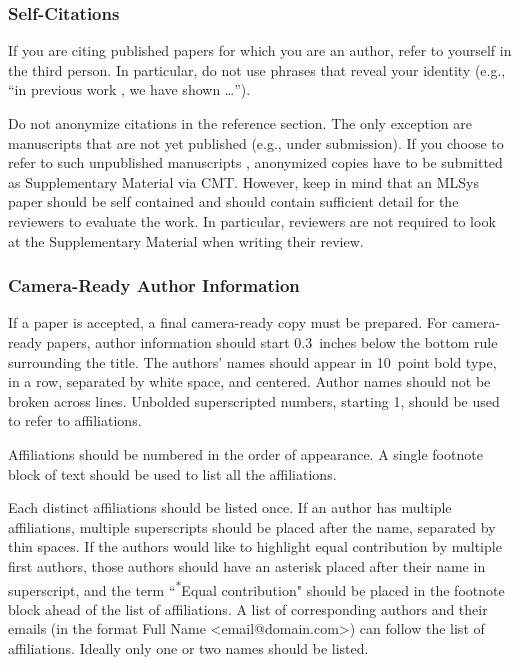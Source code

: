 \documentclass{article}
\begin{document}
\subsubsection{Self-Citations}

If you are citing published papers for which you are an author, refer
to yourself in the third person. In particular, do not use phrases
that reveal your identity (e.g., ``in previous work \cite{langley00}, we
have shown \ldots'').

Do not anonymize citations in the reference section. The only exception are manuscripts that are
not yet published (e.g., under submission). If you choose to refer to
such unpublished manuscripts \cite{anonymous}, anonymized copies have
to be submitted
as Supplementary Material via CMT\@. However, keep in mind that an MLSys
paper should be self contained and should contain sufficient detail
for the reviewers to evaluate the work. In particular, reviewers are
not required to look at the Supplementary Material when writing their
review.

\subsubsection{Camera-Ready Author Information}
\label{final author}

If a paper is accepted, a final camera-ready copy must be prepared.
%
For camera-ready papers, author information should start 0.3~inches below the
bottom rule surrounding the title. The authors' names should appear in 10~point
bold type, in a row, separated by white space, and centered. Author names should
not be broken across lines. Unbolded superscripted numbers, starting 1, should
be used to refer to affiliations.

Affiliations should be numbered in the order of appearance. A single footnote
block of text should be used to list all the affiliations.

Each distinct affiliations should be listed once. If an author has multiple
affiliations, multiple superscripts should be placed after the name, separated
by thin spaces. If the authors would like to highlight equal contribution by
multiple first authors, those authors should have an asterisk placed after their
name in superscript, and the term ``\textsuperscript{*}Equal contribution"
should be placed in the footnote block ahead of the list of affiliations. A
list of corresponding authors and their emails (in the format Full Name
\textless{}email@domain.com\textgreater{}) can follow the list of affiliations.
Ideally only one or two names should be listed.
\end{document}
